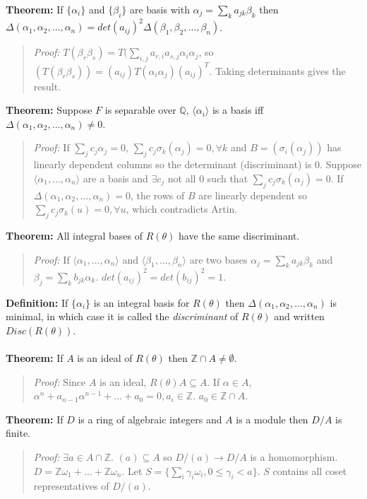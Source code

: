 {\bf Theorem:}
If $\{\alpha_i\}$ and $\{\beta_i\}$ are basis with
$\alpha_j= \sum_k a_{jk}\beta_k$ then
$\Delta(\alpha_1, \alpha_2, \ldots, \alpha_n)= det(a_{ij})^2
\Delta(\beta_1, \beta_2, \ldots, \beta_n)$.
\begin{quote}
\emph{Proof:} $T( \beta_r \beta_s)= T(\sum_{i,j} a_{r,i} a_{s,j} \alpha_i \alpha_j$,
so $(T(\beta_r \beta_s ) )= (a_{ij}) T(\alpha_i \alpha_j) (a_{ij})^T$.  Taking determinants
gives the result.
\end{quote}
{\bf Theorem:}  Suppose $F$ is separable over ${\mathbb Q}$,
$\langle \alpha_i \rangle$ is a basis iff
$\Delta(\alpha_1, \alpha_2, \ldots, \alpha_n) \ne 0$.
\begin{quote}
\emph{Proof:} If 
$\sum_j c_j \alpha_j =0$,
$\sum_j c_j \sigma_k(\alpha_j) =0, \forall k$ and $B=(\sigma_i (\alpha_j))$ has linearly dependent
columns so the determinant (discriminant) is $0$.  Suppose 
$\langle \alpha_1 , \ldots , \alpha_n \rangle$
are a basis and $\exists c_j$ not all $0$ such that $\sum_j c_j \sigma_k(\alpha_j) = 0$.
If 
$\Delta(\alpha_1, \alpha_2, \ldots, \alpha_n)= 0$, the rows of $B$ are linearly dependent so
$\sum_j c_j \sigma_k(u) = 0, \forall u$, which contradicts Artin.
\end{quote}
{\bf Theorem:}
All integral bases of $R(\theta)$ have the same discriminant.
\begin{quote}
\emph{Proof:} If 
$\langle \alpha_1 , \ldots , \alpha_n \rangle$ and
$\langle \beta_1 , \ldots , \beta_n \rangle$ are two bases
$\alpha_j= \sum_k a_{jk}\beta_k$ and
$\beta_j= \sum_k b_{jk}\alpha_k$.
$det(a_{ij})^2= det(b_{ij})^2 = 1$.
\end{quote}
{\bf Definition:}
If $\{\alpha_i\}$ is an integral basis for $R(\theta)$ then
$\Delta(\alpha_1, \alpha_2, \ldots, \alpha_n)$ is minimal,
in which case it is called the \emph{discriminant} of $R(\theta)$ and written
$Disc(R(\theta))$.
\\
\\
{\bf Theorem:} If $A$ is an ideal of $R(\theta)$ then
${\mathbb Z} \cap A \ne \emptyset$.
\begin{quote}
\emph{Proof:} 
Since $A$ is an ideal, $R(\theta) A \subseteq A$.
If $\alpha \in A$, $ \alpha^n + a_{n-1} \alpha^{n-1} + \ldots + a_0= 0, a_i \in {\mathbb Z}$.
$a_0 \in {\mathbb Z} \cap A$.
\end{quote}
{\bf Theorem:}
If $D$ is a ring of algebraic integers and $A$ is a module then $D/A$ is finite.
\begin{quote}
\emph{Proof:} $\exists a \in A \cap {\mathbb Z}$.  $(a) \subseteq A$ so $D/(a) \rightarrow D/A$ is
a homomorphism.  $D= {\mathbb Z} \omega_1 + \ldots + {\mathbb Z} \omega_n$.  Let
$S= \{ \sum_i \gamma_i \omega_i, 0 \leq \gamma_i < a \}$.  $S$ contains all coset representatives
of $D/(a)$.
\end{quote}

